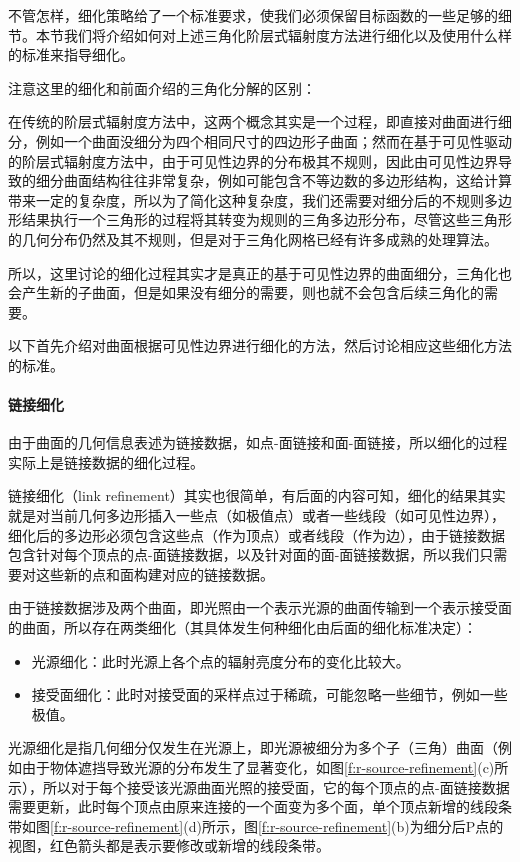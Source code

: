 不管怎样，细化策略给了一个标准要求，使我们必须保留目标函数的一些足够的细节。本节我们将介绍如何对上述三角化阶层式辐射度方法进行细化以及使用什么样的标准来指导细化。

\begin{myshaded}
	注意这里的细化和前面介绍的三角化分解的区别：
	
	在传统的阶层式辐射度方法中，这两个概念其实是一个过程，即直接对曲面进行细分，例如一个曲面没细分为四个相同尺寸的四边形子曲面；然而在基于可见性驱动的阶层式辐射度方法中，由于可见性边界的分布极其不规则，因此由可见性边界导致的细分曲面结构往往非常复杂，例如可能包含不等边数的多边形结构，这给计算带来一定的复杂度，所以为了简化这种复杂度，我们还需要对细分后的不规则多边形结果执行一个三角形的过程将其转变为规则的三角多边形分布，尽管这些三角形的几何分布仍然及其不规则，但是对于三角化网格已经有许多成熟的处理算法。
	
	所以，这里讨论的细化过程其实才是真正的基于可见性边界的曲面细分，三角化也会产生新的子曲面，但是如果没有细分的需要，则也就不会包含后续三角化的需要。
\end{myshaded}

以下首先介绍对曲面根据可见性边界进行细化的方法，然后讨论相应这些细化方法的标准。




\paragraph{链接细化}
由于曲面的几何信息表述为链接数据，如点-面链接和面-面链接，所以细化的过程实际上是链接数据的细化过程。

链接细化（link refinement）其实也很简单，有后面的内容可知，细化的结果其实就是对当前几何多边形插入一些点（如极值点）或者一些线段（如可见性边界），细化后的多边形必须包含这些点（作为顶点）或者线段（作为边），由于链接数据包含针对每个顶点的点-面链接数据，以及针对面的面-面链接数据，所以我们只需要对这些新的点和面构建对应的链接数据。

由于链接数据涉及两个曲面，即光照由一个表示光源的曲面传输到一个表示接受面的曲面，所以存在两类细化（其具体发生何种细化由后面的细化标准决定）：

\begin{itemize}
	\item 光源细化：此时光源上各个点的辐射亮度分布的变化比较大。
	\item 接受面细化：此时对接受面的采样点过于稀疏，可能忽略一些细节，例如一些极值。
\end{itemize}

光源细化是指几何细分仅发生在光源上，即光源被细分为多个子（三角）曲面（例如由于物体遮挡导致光源的分布发生了显著变化，如图\ref{f:r-source-refinement}(c)所示），所以对于每个接受该光源曲面光照的接受面，它的每个顶点的点-面链接数据需要更新，此时每个顶点由原来连接的一个面变为多个面，单个顶点新增的线段条带如图\ref{f:r-source-refinement}(d)所示，图\ref{f:r-source-refinement}(b)为细分后P点的视图，红色箭头都是表示要修改或新增的线段条带。

